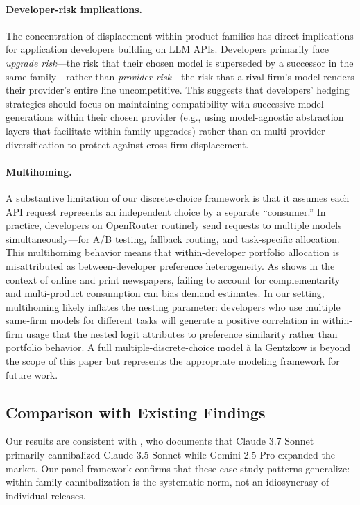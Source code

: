 \documentclass[11pt, a4paper]{article}
\begin{document}
\paragraph{Developer-risk implications.} The concentration of displacement within product families has direct implications for application developers building on LLM APIs. Developers primarily face \emph{upgrade risk}---the risk that their chosen model is superseded by a successor in the same family---rather than \emph{provider risk}---the risk that a rival firm's model renders their provider's entire line uncompetitive. This suggests that developers' hedging strategies should focus on maintaining compatibility with successive model generations within their chosen provider (e.g., using model-agnostic abstraction layers that facilitate within-family upgrades) rather than on multi-provider diversification to protect against cross-firm displacement.

\paragraph{Multihoming.} A substantive limitation of our discrete-choice framework is that it assumes each API request represents an independent choice by a separate ``consumer.'' In practice, developers on OpenRouter routinely send requests to multiple models simultaneously---for A/B testing, fallback routing, and task-specific allocation. This multihoming behavior means that within-developer portfolio allocation is misattributed as between-developer preference heterogeneity. As \citet{gentzkow2007valuing} shows in the context of online and print newspapers, failing to account for complementarity and multi-product consumption can bias demand estimates. In our setting, multihoming likely inflates the nesting parameter: developers who use multiple same-firm models for different tasks will generate a positive correlation in within-firm usage that the nested logit attributes to preference similarity rather than portfolio behavior. A full multiple-discrete-choice model \`{a} la Gentzkow is beyond the scope of this paper but represents the appropriate modeling framework for future work.

\subsection{Comparison with Existing Findings}

Our results are consistent with \citet{fradkin2025demand}, who documents that Claude 3.7 Sonnet primarily cannibalized Claude 3.5 Sonnet while Gemini 2.5 Pro expanded the market. Our panel framework confirms that these case-study patterns generalize: within-family cannibalization is the systematic norm, not an idiosyncrasy of individual releases.
\end{document}
